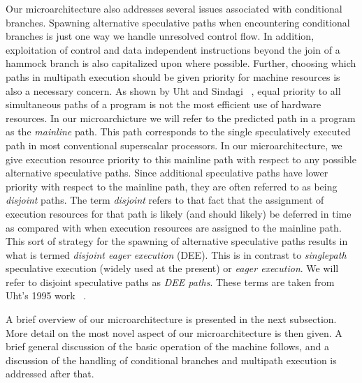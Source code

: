 \documentclass[10pt,dvips]{article}
\begin{document}
Our microarchitecture also 
addresses several issues associated with conditional branches.
Spawning alternative speculative paths when encountering conditional
branches is just one way we handle unresolved control flow.
In addition, exploitation of control
and data independent instructions beyond the join of a hammock
branch is also capitalized upon where possible.
Further, choosing which paths in multipath execution should
be given priority for machine resources is also a necessary concern.
As shown by Uht and Sindagi ~\cite{Uht95},
equal priority to all simultaneous paths
of a program is not the most efficient use of hardware resources.
In our microarchicture we will refer to the predicted path
in a program as the 
\textit{mainline} path.  
This path corresponds to the single speculatively
executed path in most conventional superscalar processors.
In our microarchitecture,
we give execution resource priority to this mainline path with respect
to any possible alternative speculative paths.  
Since additional speculative paths have lower priority with
respect to the mainline path, they are often referred
to as being
\textit{disjoint} paths.  
The term \textit{disjoint} refers to that fact that the assignment
of execution resources for that path is likely (and should likely) be
deferred in time
as compared with when execution resources are assigned to the mainline
path.  This sort of strategy for the spawning of alternative speculative
paths results in what is termed \textit{disjoint eager execution} (DEE).
This is in contrast to \textit{singlepath} speculative execution
(widely used at the present)
or \textit{eager execution}.
We will refer to disjoint speculative paths as \textit{DEE paths}.
These terms are taken from Uht's 1995 work ~\cite{Uht95}.

A brief overview of our microarchitecture is presented in the next
subsection.  
More detail on the most novel aspect of our microarchitecture
is then given.
A brief general discussion of the basic operation
of the machine follows, and a discussion of the handling
of conditional branches and multipath execution is addressed after that.
%
\end{document}
